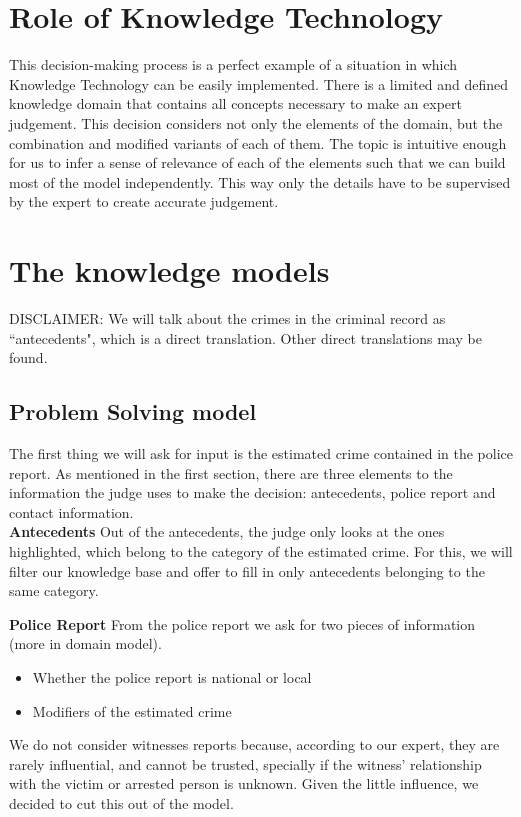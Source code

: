 \documentclass{article}
\begin{document}
\section{Role of Knowledge Technology}
This decision-making process is a perfect example of a situation in which Knowledge Technology can be easily implemented. There is a limited and defined knowledge domain that contains all concepts necessary to make an expert judgement. This decision considers not only the elements of the domain, but the combination and modified variants of each of them. 
The topic is intuitive enough for us to infer a sense of relevance of each of the elements such that we can build most of the model independently. This way only the details have to be supervised by the expert to create accurate judgement.

\section{The knowledge models}
DISCLAIMER: We will talk about the crimes in the criminal record as ``antecedents", which is a direct translation. Other direct translations may be found.

\subsection{Problem Solving model}
The first thing we will ask for input is the estimated crime contained in the police report. As mentioned in the first section, there are three elements to the information the judge uses to make the decision: antecedents, police report and contact information.
\\
\textbf{Antecedents} Out of the antecedents, the judge only looks at the ones highlighted, which belong to the category of the estimated crime. For this, we will filter our knowledge base and offer to fill in only antecedents belonging to the same category.

\textbf{Police Report} From the police report we ask for two pieces of information (more in domain model). 
\begin{itemize}
    \item Whether the police report is national or local
    \item Modifiers of the estimated crime 
\end{itemize}
We do not consider witnesses reports because, according to our expert, they are rarely influential, and cannot be trusted, specially if the witness' relationship with the victim or arrested person is unknown. Given the little influence, we decided to cut this out of the model. 
\end{document}
